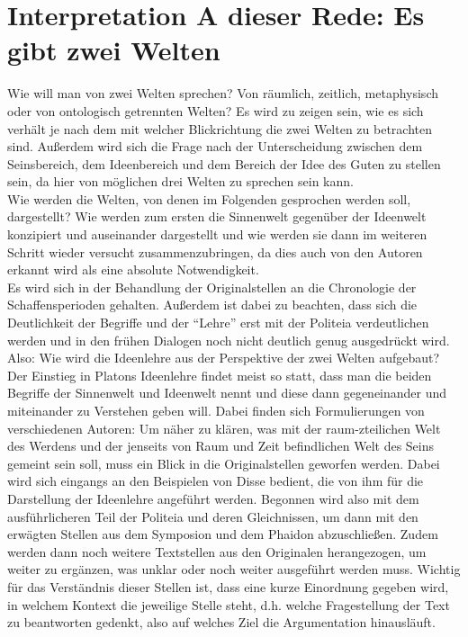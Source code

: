 \section{Interpretation A dieser Rede: Es gibt zwei Welten}
Wie will man von zwei Welten sprechen? Von räumlich, zeitlich, metaphysisch oder von ontologisch getrennten Welten? Es wird zu zeigen sein, wie es sich verhält je nach dem mit welcher Blickrichtung die zwei Welten zu betrachten sind. Außerdem wird sich die Frage nach der Unterscheidung zwischen dem Seinsbereich, dem Ideenbereich und dem Bereich der Idee des Guten zu stellen sein, da hier von möglichen drei Welten zu sprechen sein kann.\\
Wie werden die Welten, von denen im Folgenden gesprochen werden soll, dargestellt? Wie werden zum ersten die Sinnenwelt gegenüber der Ideenwelt konzipiert und auseinander dargestellt und wie werden sie dann im weiteren Schritt wieder versucht zusammenzubringen, da dies auch von den Autoren erkannt wird als eine absolute Notwendigkeit.\\
Es wird sich in der Behandlung der Originalstellen an die Chronologie der Schaffensperioden gehalten. Außerdem ist dabei zu beachten, dass sich die Deutlichkeit der Begriffe und der \enquote{Lehre} erst mit der Politeia verdeutlichen werden und in den frühen Dialogen noch nicht deutlich genug ausgedrückt wird. 
Also: Wie wird die Ideenlehre aus der Perspektive der zwei Welten aufgebaut?\\
Der Einstieg in Platons Ideenlehre findet meist so statt, dass man die beiden Begriffe der Sinnenwelt und Ideenwelt nennt und diese dann gegeneinander und miteinander zu Verstehen geben will. Dabei finden sich Formulierungen von verschiedenen Autoren: 
Um näher zu klären, was mit der raum-zteilichen Welt des Werdens und der jenseits von Raum und Zeit befindlichen Welt des Seins gemeint sein soll, muss ein Blick in die Originalstellen geworfen werden. Dabei wird sich eingangs an den Beispielen von Disse bedient, die von ihm für die Darstellung der Ideenlehre angeführt werden. Begonnen wird also mit dem ausführlicheren Teil der Politeia und deren Gleichnissen, um dann mit den erwägten Stellen aus dem Symposion und dem Phaidon abzuschließen. Zudem werden dann noch weitere Textstellen aus den Originalen herangezogen, um weiter zu ergänzen, was unklar oder noch weiter ausgeführt werden muss. Wichtig für das Verständnis dieser Stellen ist, dass eine kurze Einordnung gegeben wird, in welchem Kontext die jeweilige Stelle steht, d.h. welche Fragestellung der Text zu beantworten gedenkt, also auf welches Ziel die Argumentation hinausläuft.

